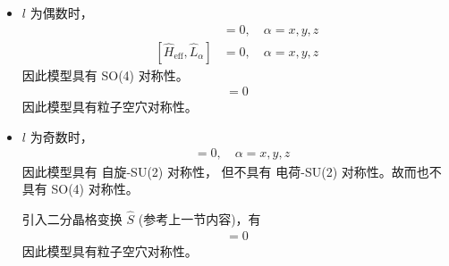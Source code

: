 \begin{itemize}

\item $l$ 为偶数时，
\begin{align}
[\hat{H}_{\text{eff}}, \hat{S}_{\alpha}] &= 0, \quad \alpha=x,y,z \\
[\hat{H}_{\text{eff}}, \hat{L}_{\alpha}] &= 0, \quad \alpha=x,y,z 
\end{align}
因此模型具有 SO(4) 对称性。
\begin{align}
[\hat{H}_{\text{eff}}, \hat{C}]=0
\end{align}
因此模型具有粒子空穴对称性。

\item $l$ 为奇数时，
\begin{align}
[\hat{H}_{\text{eff}}, \hat{S}_{\alpha}] &= 0, \quad \alpha=x,y,z
\end{align}
因此模型具有 自旋-SU(2) 对称性，
但不具有 电荷-SU(2) 对称性。故而也不具有 SO(4) 对称性。

引入二分晶格变换 $\hat{S}$ (参考上一节内容)，有
\begin{align}
[\hat{H}_{\text{eff}}, \hat{C}\hat{S}]=0
\end{align}
因此模型具有粒子空穴对称性。

\end{itemize}



